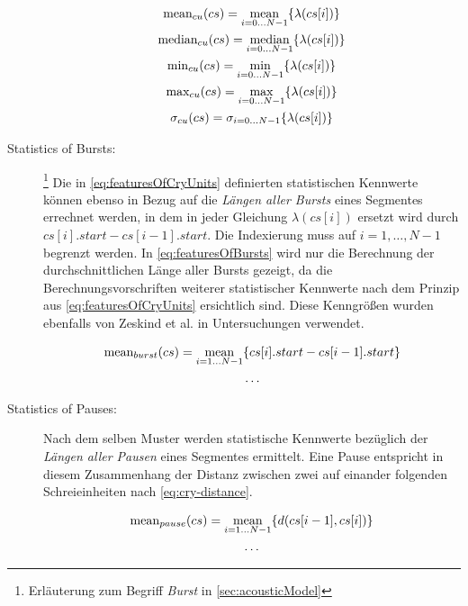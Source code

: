 \begin{description}
\begin{equation}
\begin{gathered}
\text{mean}_{cu}(cs) = \operatorname*{mean}_{i = 0 \ldots N-1}\{\lambda(cs[i])\} \\
\text{median}_{cu}(cs) = \operatorname*{median}_{i = 0 \ldots N-1}\{\lambda(cs[i])\} \\
\text{min}_{cu}(cs) = \operatorname*{min}_{i = 0 \ldots N-1}\{\lambda(cs[i])\} \\
\text{max}_{cu}(cs) = \operatorname*{max}_{i = 0 \ldots N-1}\{\lambda(cs[i])\} \\
\sigma_{cu}(cs) =  \sigma_{i = 0 \ldots N-1}\{\lambda(cs[i])\} 
\end{gathered}
\label{eq:featuresOfCryUnits}
\end{equation}

\item[Statistics of Bursts:]\footnote{Erläuterung zum Begriff \emph{Burst} in \autoref{sec:acousticModel}} Die in \autoref{eq:featuresOfCryUnits} definierten statistischen Kennwerte können ebenso in Bezug auf die \emph{Längen aller Bursts} eines Segmentes errechnet werden, in dem in jeder Gleichung $\lambda(cs[i])$ ersetzt wird durch $cs[i].start - cs[i-1].start$. Die Indexierung muss auf $i = 1 ,\ldots, N-1$ begrenzt werden. In \autoref{eq:featuresOfBursts} wird nur die Berechnung der durchschnittlichen Länge aller Bursts gezeigt, da die Berechnungsvorschriften weiterer statistischer Kennwerte nach dem Prinzip aus \autoref{eq:featuresOfCryUnits} ersichtlich sind. Diese Kenngrößen wurden ebenfalls von Zeskind et al. \cite{rythmic} in Untersuchungen verwendet.

\begin{equation}
\begin{gathered}
\text{mean}_{burst}(cs) = \operatorname*{mean}_{i = 1 \ldots N-1}\{cs[i].start - cs[i-1].start\} \\
\ldots
\end{gathered}
\label{eq:featuresOfBursts}
\end{equation}

\item[Statistics of Pauses:] Nach dem selben Muster werden statistische Kennwerte bezüglich der  \emph{Längen aller Pausen} eines Segmentes ermittelt. Eine Pause entspricht in diesem Zusammenhang der Distanz zwischen zwei auf einander folgenden Schreieinheiten nach \autoref{eq:cry-distance}.

\begin{equation}
\begin{gathered}
\text{mean}_{pause}(cs) = \operatorname*{mean}_{i = 1 \ldots N-1}\{d(cs[i-1],cs[i])\} \\
\ldots
\end{gathered}
\label{eq:featuresOfPauses}
\end{equation}


\end{description}
